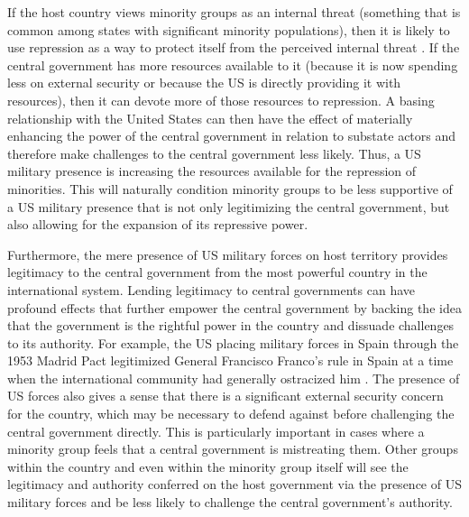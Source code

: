 If the host country views minority groups as an internal threat (something that is common among states with significant minority populations), then it is likely to use repression as a way to protect itself from the perceived internal threat \cite{Regan2005,Jakobsen2009,Brathwaite2014,Hendrix2019}.  If the central government has more resources available to it (because it is now spending less on external security or because the US is directly providing it with resources), then it can devote more of those resources to repression.  A basing relationship with the United States can then have the effect of materially enhancing the power of the central government in relation to substate actors and therefore make challenges to the central government less likely. Thus, a US military presence is increasing the resources available for the repression of minorities.  This will naturally condition minority groups to be less supportive of a US military presence that is not only legitimizing the central government, but also allowing for the expansion of its repressive power.

Furthermore, the mere presence of US military forces on host territory provides legitimacy to the central government from the most powerful country in the international system. Lending legitimacy to central governments can have profound effects that further empower the central government by backing the idea that the government is the rightful power in the country and dissuade challenges to its authority.  For example, the US placing military forces in Spain through the 1953 Madrid Pact legitimized General Francisco Franco's rule in Spain at a time when the international community had generally ostracized him \cite{cooley2008}. The presence of US forces also gives a sense that there is a significant external security concern for the country, which may be necessary to defend against before challenging the central government directly. This is particularly important in cases where a minority group feels that a central government is mistreating them. Other groups within the country and even within the minority group itself will see the legitimacy and authority conferred on the host government via the presence of US military forces and be less likely to challenge the central government's authority. 


